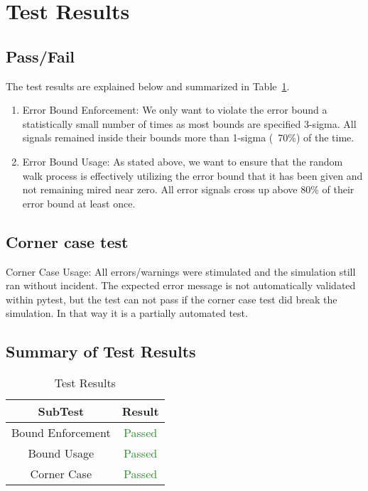 \section{Test Results}

\subsection{Pass/Fail}
The test results are explained below and summarized in Table~\ref{tab:results}.

\begin{enumerate}
\item{Error Bound Enforcement: We only want to violate the error bound a 
   statistically small number of times as most bounds are specified 3-sigma.  
   All signals remained inside their bounds more than 1-sigma (~70\%) of the time.  }
\item{Error Bound Usage: As stated above, we want to ensure that the random 
   walk process is effectively utilizing the error bound that it has been 
   given and not remaining mired near zero.  All error signals cross up above 
   80\% of their error bound at least once.}
  \end{enumerate}
  
  \subsection{Corner case test} 
  
Corner Case Usage: All errors/warnings were stimulated and the simulation still ran without incident.
The expected error message is not automatically validated within pytest, but the test can not pass
if the corner case test did break the simulation. In that way it is a partially automated test. 

\subsection{Summary of Test Results}

\begin{table}[htbp]
    \caption{Test Results}
\label{tab:results}
    \centering \fontsize{10}{10}\selectfont
\begin{tabular}{|c||c|}
\hline
SubTest & Result \\ \hline \hline
Bound Enforcement& \textcolor{ForestGreen}{Passed} \\ \hline
Bound Usage &  \textcolor{ForestGreen}{Passed}\\ \hline
Corner Case &  \textcolor{ForestGreen}{Passed}\\ \hline
\end{tabular}
\end{table}

